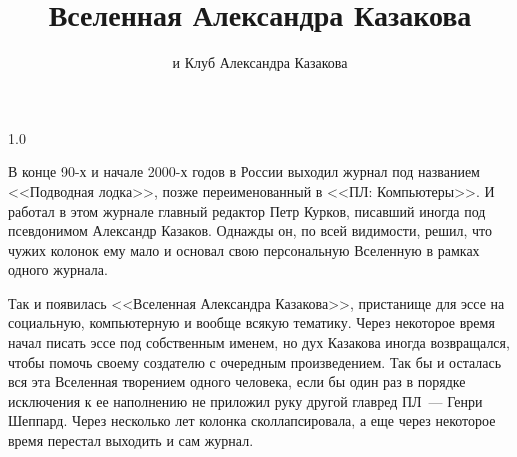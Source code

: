 \documentclass{scrbook}
\newcommand{\tocnumwidth}{5em}
\newcommand{\tocspacing}{1.0} %
\newcommand{\tocmarginwidth}{2.55em} %
\newcommand{\tocnumwidth}{5em}
\newcommand{\tocspacing}{0.9} %
\newcommand{\tocmarginwidth}{2.55em} %
\newcommand{\tocnumwidth}{5em}
\newcommand{\tocspacing}{0.9}
\newcommand{\tocmarginwidth}{2.55em} %
\newcommand{\flqq}{<<}
\newcommand{\frqq}{>>}
\newcommand{\mdash}{~--- }
\begin{document}


\date{}
\title{Вселенная Александра Казакова}
\subtitle{и Клуб Александра Казакова}
\date{}
\publishers{\small{Собрано и сверстано Богданом Опанчуком, \\ скомпилировано \today \\ Мельбурн, Австралия}}

\maketitle

\frontmatter

\clearpage
\begingroup
	\pagestyle{empty}
	\renewcommand*{\chapterpagestyle}{empty}

	\renewcommand{\@pnumwidth}{\tocnumwidth}
	\renewcommand{\@tocrmarg}{\tocmarginwidth plus1fil} %

	\begin{spacing}{\tocspacing}
	\tableofcontents
	\end{spacing}


В конце 90-х и начале 2000-х годов в России выходил журнал под названием {\flqq}Подводная лодка{\frqq}, позже переименованный в {\flqq}ПЛ: Компьютеры{\frqq}. И работал в этом журнале главный редактор Петр Курков, писавший иногда под псевдонимом Александр Казаков. Однажды он, по всей видимости, решил, что чужих колонок ему мало и основал свою персональную Вселенную в рамках одного журнала.

Так и появилась {\flqq}Вселенная Александра Казакова{\frqq}, пристанище для эссе на социальную, компьютерную и вообще всякую тематику. Через некоторое время начал писать эссе под собственным именем, но дух Казакова иногда возвращался, чтобы помочь своему создателю с очередным произведением. Так бы и осталась вся эта Вселенная творением одного человека, если бы один раз в порядке исключения к ее наполнению не приложил руку другой главред ПЛ{\mdash}Генри Шеппард. Через несколько лет колонка сколлапсировала, а еще через некоторое время перестал выходить и сам журнал.
\end{document}
